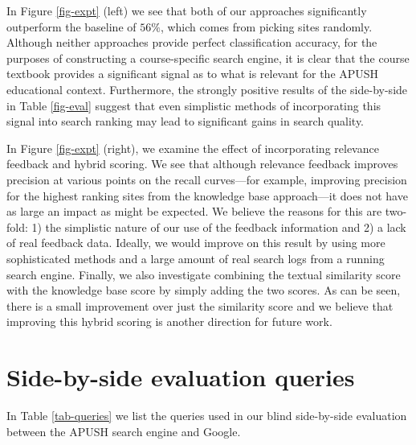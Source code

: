 \documentclass[pdfpagelabels=false,plainpages=true]{acm_proc_article-sp}
\begin{document}
In Figure \ref{fig-expt} (left) we see that both of our approaches significantly
outperform the baseline of $56\%$, which comes from picking sites
randomly. Although neither approaches provide perfect classification accuracy,
for the purposes of constructing a course-specific search engine, it is clear
that the course textbook provides a significant signal as to what is relevant
for the APUSH educational context.  Furthermore, the strongly positive
results of the side-by-side in Table \ref{fig-eval} suggest that even simplistic
methods of incorporating this signal into search ranking may lead to significant
gains in search quality.


In Figure \ref{fig-expt} (right), we examine the effect of incorporating
relevance feedback and hybrid scoring. We see that although relevance feedback
improves precision at various points on the recall curves---for example,
improving precision for the highest ranking sites from the knowledge base
approach---it does not have as large an impact as might be expected. We believe
the reasons for this are two-fold: 1) the simplistic nature of our use of the
feedback information and 2) a lack of real feedback data. Ideally, we would
improve on this result by using more sophisticated methods and a large amount of
real search logs from a running search engine. Finally, we also
investigate combining the textual similarity score with the knowledge base
score by simply adding the two scores. As can be seen, there
is a small improvement over just the similarity score and we believe that
improving this hybrid scoring is another direction for future work.




\appendix
\section{Side-by-side evaluation queries}
\label{app-queries}

In Table \ref{tab-queries} we list the queries used in our blind side-by-side
evaluation between the APUSH search engine and Google.
\end{document}
